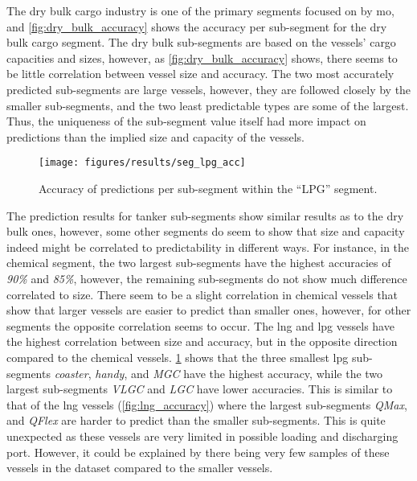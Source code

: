 The dry bulk cargo industry is one of the primary segments focused on by \acrshort{mo}, and \cref{fig:dry_bulk_accuracy} shows the accuracy per sub-segment for the dry bulk cargo segment. The dry bulk sub-segments are based on the vessels' cargo capacities and sizes, however, as \cref{fig:dry_bulk_accuracy} shows, there seems to be little correlation between vessel size and accuracy. The two most accurately predicted sub-segments are large vessels, however, they are followed closely by the smaller sub-segments, and the two least predictable types are some of the largest. Thus, the uniqueness of the sub-segment value itself had more impact on predictions than the implied size and capacity of the vessels.

\begin{figure}[htbp]
    \centering
    \texttt{[image: figures/results/seg\_lpg\_acc]}
    \caption{Accuracy of predictions per sub-segment within the ``LPG'' segment.}
    \label{fig:lpg_accuracy}
\end{figure}

The prediction results for tanker sub-segments show similar results as to the dry bulk ones, however, some other segments do seem to show that size and capacity indeed might be correlated to predictability in different ways. For instance, in the chemical segment, the two largest sub-segments have the highest accuracies of \textit{90\%} and \textit{85\%}, however, the remaining sub-segments do not show much difference correlated to size. There seem to be a slight correlation in chemical vessels that show that larger vessels are easier to predict than smaller ones, however, for other segments the opposite correlation seems to occur. The \acrfull{lng} and \acrfull{lpg} vessels have the highest correlation between size and accuracy, but in the opposite direction compared to the chemical vessels. \cref{fig:lpg_accuracy} shows that the three smallest \acrshort{lpg} sub-segments \textit{coaster}, \textit{handy}, and \textit{MGC} have the highest accuracy, while the two largest sub-segments \textit{VLGC} and \textit{LGC}  have lower accuracies. This is similar to that of the \acrshort{lng} vessels (\cref{fig:lng_accuracy}) where the largest sub-segments \textit{QMax}, and \textit{QFlex} are harder to predict than the smaller sub-segments. This is quite unexpected as these vessels are very limited in possible loading and discharging port. However, it could be explained by there being very few samples of these vessels in the dataset compared to the smaller vessels.

